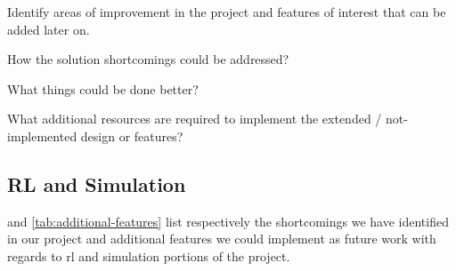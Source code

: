 \documentclass[../main.tex]{subfiles}
\begin{document}
\begin{newrequirements}
    \begin{todolist}
    \item[\done] Identify areas of improvement in the 
        project and features of interest that 
        can be added later on. 

    \item[\done] How the solution shortcomings could be 
        addressed? 

    \item[\done] What things could be done better? 

    \item[\done] What additional resources are required 
        to implement the extended / not-
        implemented design or features?

    \end{todolist}
\end{newrequirements}

\lipsum[1]


\subsection{RL and Simulation}

 and \cref{tab:additional-features} list
respectively the shortcomings we have identified in our project and
additional features we could implement as future work with regards to
\gls{rl} and simulation portions of the project.
\end{document}

